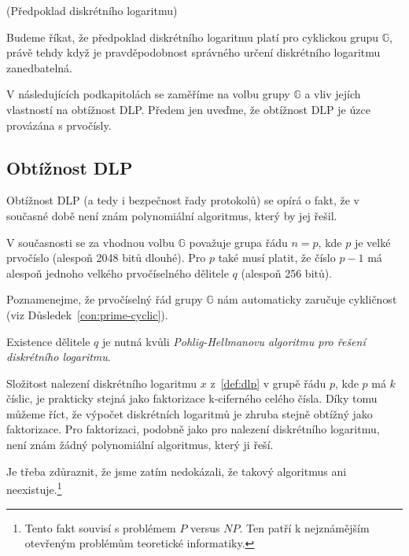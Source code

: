 \documentclass[
  program=infoi,
  biblatex,
  figures=false,
  glossaries,
  index
]{kidiplom}
\begin{document}

        \begin{definition}\label{def:discrete-log-assumption}
            (Předpoklad diskrétního logaritmu)
            
            Budeme říkat, že předpoklad diskrétního logaritmu platí pro cyklickou grupu $\mathbb{G}$, právě tehdy když
            je pravděpodobnost správného určení diskrétního logaritmu zanedbatelná. 

        \end{definition}

        V následujících podkapitolách se zaměříme na volbu grupy $\mathbb{G}$ a vliv jejích
        vlastností na obtížnost DLP. Předem jen uveďme, že obtížnost DLP je úzce provázána s prvočísly.


        \subsection{Obtížnost DLP}\label{sub:discrete-log-complexity}

        Obtížnost DLP (a tedy i bezpečnost řady protokolů) se opírá o fakt, že v současné době není znám polynomiální
        algoritmus, který by jej řešil.

        V současnosti se za vhodnou volbu $\mathbb{G}$ považuje grupa řádu $n=p$, kde
        $p$ je velké prvočíslo (alespoň 2048 bitů dlouhé). Pro $p$ také musí platit, že číslo $p-1$ má alespoň
        jednoho velkého prvočíselného dělitele $q$ (alespoň 256 bitů).

        Poznamenejme, že prvočíselný řád grupy $\mathbb{G}$ nám automaticky zaručuje cykličnost (viz Důsledek~\ref{con:prime-cyclic}).
        
        Existence dělitele $q$ je nutná kvůli \emph{Pohlig-Hellmanovu algoritmu pro řešení diskrétního logaritmu}.

        \begin{remark}
            Složitost nalezení diskrétního logaritmu $x$ z~\ref{def:dlp} v grupě řádu $p$, kde $p$ má $k$ číslic, je prakticky
            stejná jako faktorizace k-ciferného celého čísla.
            Díky tomu můžeme říct, že výpočet diskrétních logaritmů je zhruba stejně obtížný jako faktorizace.
            Pro faktorizaci, podobně jako pro nalezení diskrétního logaritmu, není znám žádný polynomiální algoritmus, který ji řeší.


            Je třeba zdůraznit, že jsme zatím nedokázali, že takový algoritmus ani neexistuje.\footnote{Tento fakt souvisí s problémem
            $P$ versus $NP$. Ten patří k nejznámějším otevřeným problémům teoretické informatiky.}
        \end{remark}
\end{document}
